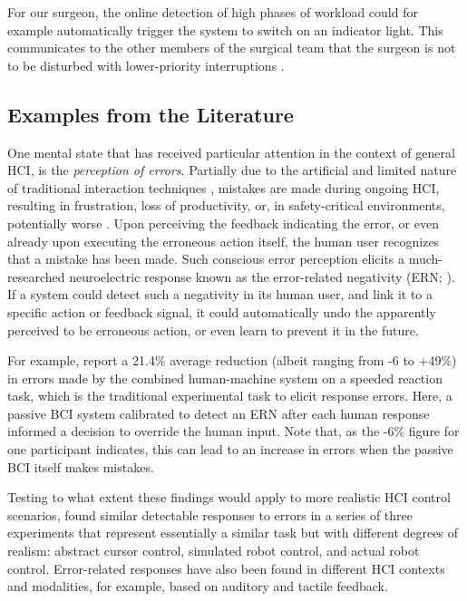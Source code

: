 For our surgeon, the online detection of high phases of workload could for example automatically trigger the system to switch on an indicator light. This communicates to the other members of the surgical team that the surgeon is not to be disturbed with lower-priority interruptions \cite{zander2017surgery}.


\subsection{Examples from the Literature}

One mental state that has received particular attention in the context of general HCI, is the \emph{perception of errors}. Partially due to the artificial and limited nature of traditional interaction techniques \cite{suchman1987hmcproblems,tufte1990}, mistakes are made during ongoing HCI, resulting in frustration, loss of productivity, or, in safety-critical environments, potentially worse \cite{reason1990humanerror}. Upon perceiving the feedback indicating the error, or even already upon executing the erroneous action itself, the human user recognizes that a mistake has been made. Such conscious error perception elicits a much-researched neuroelectric response known as the error-related negativity (ERN; ). If a system could detect such a negativity in its human user, and link it to a specific action or feedback signal, it could automatically undo the apparently perceived to be erroneous action, or even learn to prevent it in the future.

For example,  report a 21.4\% average reduction (albeit ranging from -6 to +49\%) in errors made by the combined human-machine system on a speeded reaction task, which is the traditional experimental task to elicit response errors. Here, a passive BCI system calibrated to detect an ERN after each human response informed a decision to override the human input. Note that, as the -6\% figure for one participant indicates, this can lead to an increase in errors when the passive BCI itself makes mistakes. 

Testing to what extent these findings would apply to more realistic HCI control scenarios,  found similar detectable responses to errors in a series of three experiments that represent essentially a similar task but with different degrees of realism: abstract cursor control, simulated robot control, and actual robot control. Error-related responses have also been found in different HCI contexts and modalities, for example, based on auditory \cite{zander2011music} and tactile \cite{lehne2009tactile} feedback.

